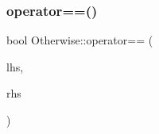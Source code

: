\subsubsection{\texorpdfstring{operator==()}{operator==()}\hspace{0.1cm}{\footnotesize\ttfamily [2/2]}}
{\footnotesize\ttfamily bool Otherwise\+::operator== (\begin{DoxyParamCaption}\item[{const \hyperlink{struct_otherwise_1_1_node_record}{Node\+Record} \&}]{lhs,  }\item[{const \hyperlink{struct_otherwise_1_1_node_record}{Node\+Record} \&}]{rhs }\end{DoxyParamCaption})}

